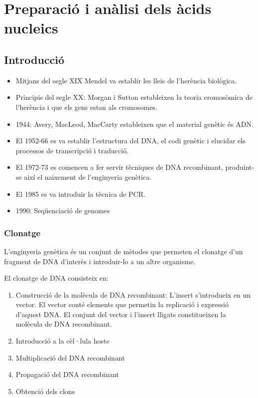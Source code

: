 \section{Preparació i anàlisi dels àcids nucleics}

\subsection{Introducció}
\begin{itemize}
\item Mitjans del segle XIX Mendel va establir les lleis de l'herència biològica.
\item Principis del segle XX: Morgan i Sutton estableixen la teoria cromosòmica de l'herència i que els gens estan als cromosomes.
\item 1944: Avery, MacLeod, MacCarty estableixen que el material genètic és ADN.
\item El 1952-66 es va establir l'estructura del DNA, el codi genètic i elucidar els processos de transcripció i traducció.
\item El 1972-73 es comencen a fer servir tècniques de DNA recombinant, produint-se així el naixement de l'enginyeria genètica.
\item El 1985 es va introduir la tècnica de PCR.
\item 1990: Seqüenciació de genomes
\end{itemize}

\subsubsection{Clonatge}
L'enginyeria genètica és un conjunt de mètodes que permeten el clonatge d'un fragment de DNA d'interès i introduir-lo a un altre organisme.

El clonatge de DNA consisteix en:
\begin{enumerate}
\item Construcció de la molècula de DNA recombinant: L'insert s'introdueix en un vector. El vector conté elements que permetin la replicació i expressió d'aquest DNA. El conjunt del vector i l'insert lligats constitueixen la molècula de DNA recombinant.
\item Introducció a la cèl·lula hoste
\item Multiplicació del DNA recombinant
\item Propagació del DNA recombinant
\item Obtenció dels clons
\end{enumerate}

